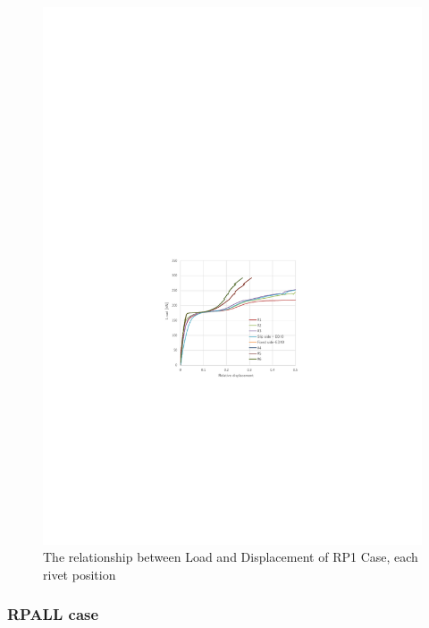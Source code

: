 \begin{figure}[htbp]
\begin{minipage}[t]{0.48\textwidth}
    \includegraphics[width=\linewidth]{imgs/ch3/fig3-20.pdf}
    \caption{The relationship between Load and Displacement of RP1 Case, each rivet position}
    \label{fig3-20}
    \end{minipage}
\end{figure} 

\subsubsection{RPALL case}

